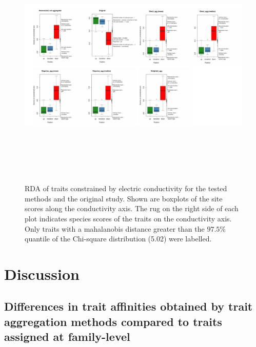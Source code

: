 \documentclass{article}
\begin{document}
\begin{figure}
  \label{fig:boxplots_scores_on_constrained_axis}
  \centering
  \includegraphics[width= 22cm, height=12cm]{Scores_on_constrained_axis_combined.pdf}
  \caption{RDA of traits constrained by electric conductivity for the tested methods and the original study. Shown are boxplots of the site scores along the conductivity axis. The rug on the right side of each plot indicates species scores of the traits on the conductivity axis. Only traits with a mahalanobis distance greater than the $97.5 \%$ quantile of the Chi-square distribution (5.02) were labelled.}
\end{figure}

\newpage


\section*{Discussion}


\subsection*{Differences in trait affinities obtained by trait aggregation methods compared to traits assigned at family-level}
\end{document}
